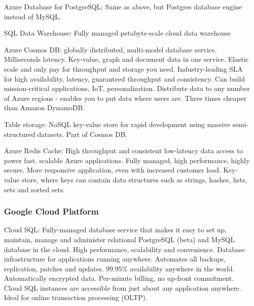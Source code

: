 Azure Database for PostgreSQL: Same as above, but Postgres database engine instead of MySQL.

SQL Data Warehouse: Fully managed petabyte-scale cloud data warehouse

Azure Cosmos DB: globally distributed, multi-model database service. Milliseconds latency. Key-value, graph and document data in one service. Elastic scale and only pay for throughput and storage you need. Industry-leading SLA for high availability, latency, guaranteed throughput and consistency. Can build mission-critical applications, IoT, personalization. Distribute data to any number of Azure regions - enables you to put data where users are. Three times cheaper than Amazon DynamoDB. 

Table storage: NoSQL key-value store for rapid development using massive semi-structured datasets. Part of Cosmos DB. 

Azure Redis Cache: High throughput and consistent low-latency data access to power fast, scalable Azure applications. Fully managed, high performance, highly secure. More responsive application, even with increased customer load. Key-value store, where keys can contain data structures such as strings, hashes, lists, sets and sorted sets. 

\subsubsection{Google Cloud Platform}

Cloud SQL: Fully-managed database service that makes it easy to set up, maintain, manage and administer relational PostgreSQL (beta) and MySQL database in the cloud. High performance, scalability and convenience. Database infrastructure for applications running anywhere. Automates all backups, replication, patches and updates. 99.95\% availability anywhere in the world. Automatically encrypted data. Per-minute billing, no up-front commitment. Cloud SQL instances are accessible from just about any application anywhere. Ideal for online transaction processing (OLTP). 

